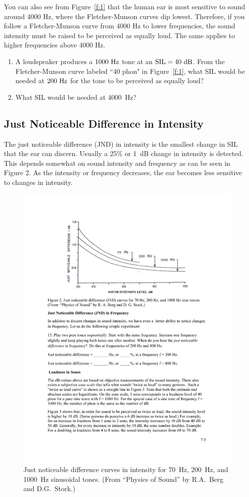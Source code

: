 \documentclass[11pt]{NSF}
\def\ben{\begin{enumerate}}
\def\een{\end{enumerate}}
\begin{document}
You can also see from Figure~\ref{f:1} that the human ear is most sensitive to
sound around 4000 Hz, where the Fletcher-Munson curves dip lowest.
Therefore, if you follow a Fletcher-Munson curve from 4000 Hz to lower
frequencies, the sound intensity must be raised to be perceived as
equally loud. The same applies to higher frequencies above 4000 Hz.

\ben
\item
A loudspeaker produces a $1000~{\rm Hz}$ tone at an ${\rm
SIL}=40~{\rm dB}$.
From the Fletcher-Munson curve labeled ``40 phon" in Figure~\ref{f:1},
what SIL would be needed at $200~{\rm Hz}$ for the tone to be 
perceived as equally loud?

\item 
What SIL would be needed at 4000~Hz?

\een

\subsection{Just Noticeable Difference in Intensity}

The just noticeable difference (JND) in intensity is the smallest
change in SIL that the ear can discern. Usually a 25\% or 1~dB change in
intensity is detected. This depends somewhat on sound intensity and
frequency as can be seen in Figure 2. As the intensity or frequency
decreases, the ear becomes less sensitive to changes in intensity.
%
\begin{figure}[hbtp]
\begin{center}
\includegraphics[width=.7\textwidth]{fig7_2}
\caption{Just noticeable difference curves in intensity 
for 70~Hz, 200~Hz, and 1000~Hz sinusoidal tones. 
(From ``Physics of Sound” by R.A.~Berg and D.G.~Stork.)}
\label{f:2}
\end{center}
\end{figure}
\end{document}
